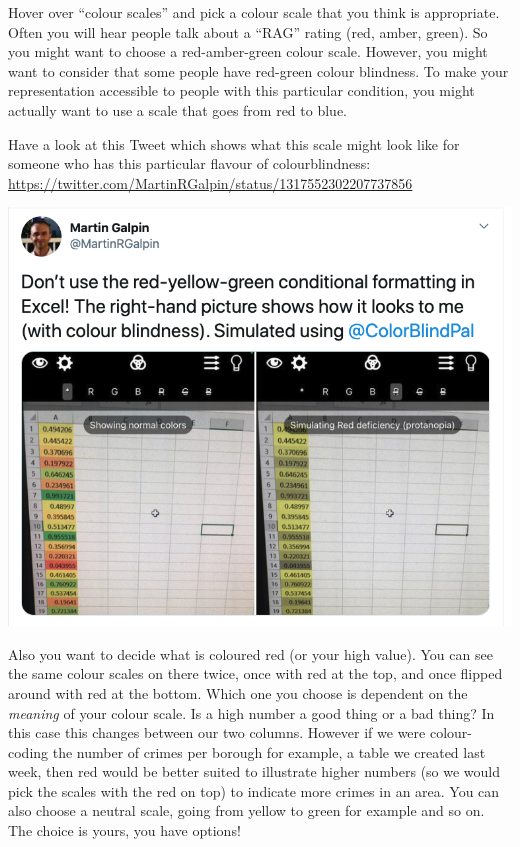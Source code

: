 \documentclass[
]{book}
\begin{document}
Hover over ``colour scales'' and pick a colour scale that you think is appropriate. Often you will hear people talk about a ``RAG'' rating (red, amber, green). So you might want to choose a red-amber-green colour scale. However, you might want to consider that some people have red-green colour blindness. To make your representation accessible to people with this particular condition, you might actually want to use a scale that goes from red to blue.

Have a look at this Tweet which shows what this scale might look like for someone who has this particular flavour of colourblindness: \url{https://twitter.com/MartinRGalpin/status/1317552302207737856}

\includegraphics{imgs/colb_condf.png}

Also you want to decide what is coloured red (or your high value). You can see the same colour scales on there twice, once with red at the top, and once flipped around with red at the bottom. Which one you choose is dependent on the \emph{meaning} of your colour scale. Is a high number a good thing or a bad thing? In this case this changes between our two columns. However if we were colour-coding the number of crimes per borough for example, a table we created last week, then red would be better suited to illustrate higher numbers (so we would pick the scales with the red on top) to indicate more crimes in an area. You can also choose a neutral scale, going from yellow to green for example and so on. The choice is yours, you have options!
\end{document}
